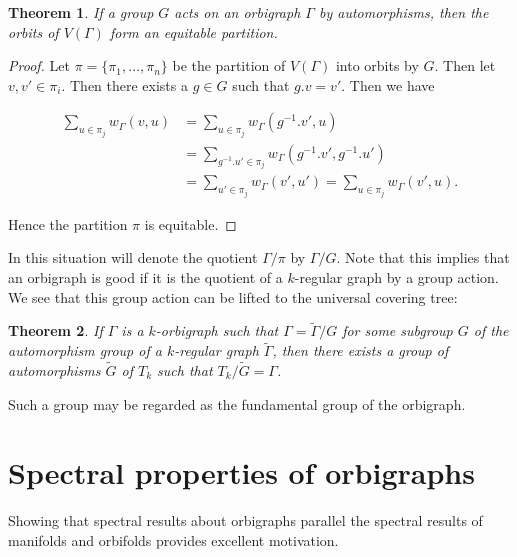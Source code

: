 \documentclass[12pt]{article}
\theoremstyle{plain}
\newtheorem{theorem}{Theorem}
\theoremstyle{definition}
\theoremstyle{remark}
\begin{document}
    \begin{theorem}\label{thm:GroupQuotient}
      If a group $G$ acts on an orbigraph $\Gamma$ by automorphisms, then the orbits of $V(\Gamma)$ form an equitable partition.
    \end{theorem}
    \begin{proof}
      Let $\pi = \{ \pi_1, \ldots, \pi_n \}$ be the partition of $V(\Gamma)$ into orbits by $G$. Then let $v, v' \in \pi_i$. Then there exists a $g \in G$ such that $g . v = v'$. Then we have
      
      \begin{align*}
        \sum_{u \in \pi_j} w_\Gamma(v, u) &= \sum_{u \in \pi_j} w_\Gamma(g^{-1}.v', u) \\
        &= \sum_{g^{-1}.u' \in \pi_j} w_\Gamma(g^{-1}.v', g^{-1}.u') \\
        &= \sum_{u' \in \pi_j} w_\Gamma(v', u') = \sum_{u \in \pi_j} w_\Gamma(v', u).
      \end{align*}

      Hence the partition $\pi$ is equitable.
    \end{proof}

    In this situation will denote the quotient $\Gamma / \pi$ by $\Gamma / G$. Note that this implies that an orbigraph is good if it is the quotient of a $k$-regular graph by a group action. We see that this group action can be lifted to the universal covering tree:

    \begin{theorem}\label{thm:GoodFundamentalGroup}
      If $\Gamma$ is a $k$-orbigraph such that $\Gamma = \widetilde{\Gamma}/G$ for some subgroup $G$ of the automorphism group of a $k$-regular graph $\widetilde{\Gamma}$, then there exists a group of automorphisms $\widetilde{G}$ of $T_k$ such that $T_k / \widetilde{G} = \Gamma$.
    \end{theorem}

    Such a group may be regarded as the fundamental group of the orbigraph.

    

\section{Spectral properties of orbigraphs}

  Showing that spectral results about orbigraphs parallel the spectral results of manifolds and orbifolds provides excellent motivation.
\end{document}
